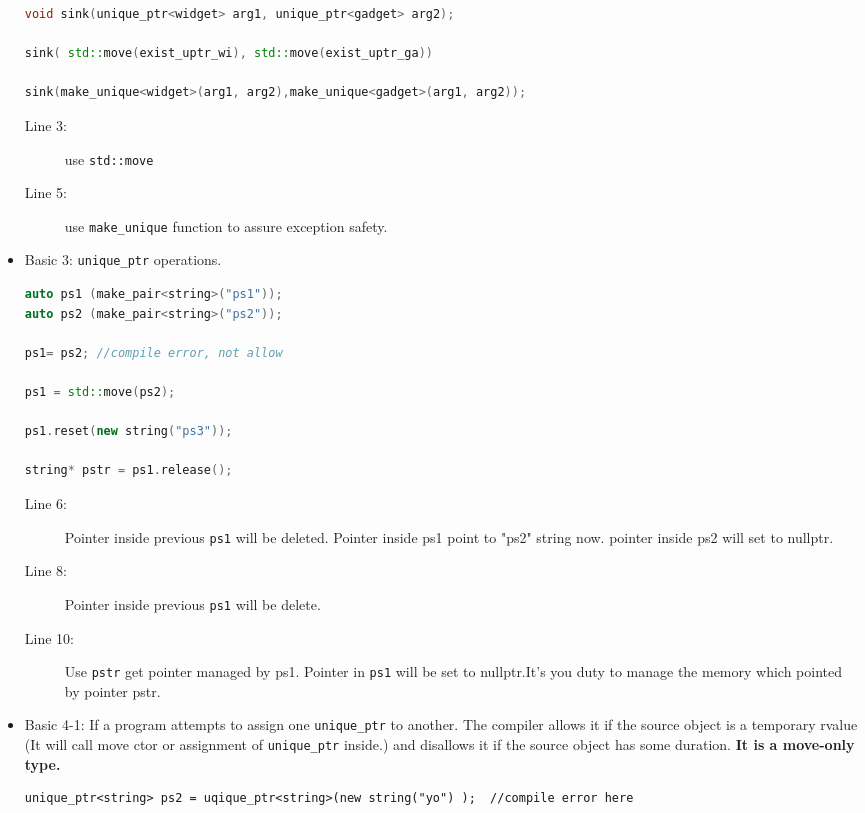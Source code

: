 \documentclass[a4paper,11pt,twoside]{book}
\begin{document}
\begin{itemize}
\begin{lstlisting}[frame=single, language=c++]
void sink(unique_ptr<widget> arg1, unique_ptr<gadget> arg2);

sink( std::move(exist_uptr_wi), std::move(exist_uptr_ga))

sink(make_unique<widget>(arg1, arg2),make_unique<gadget>(arg1, arg2));  
\end{lstlisting}
\begin{description} 
	\item[Line 3:] use \texttt{std::move}
	\item[Line 5:] use \texttt{make\_unique} function to assure exception safety.
\end{description}


\item Basic 3: \texttt{unique\_ptr} operations.
\begin{lstlisting}[frame=single, language=c++]
auto ps1 (make_pair<string>("ps1"));
auto ps2 (make_pair<string>("ps2"));

ps1= ps2; //compile error, not allow

ps1 = std::move(ps2);

ps1.reset(new string("ps3"));

string* pstr = ps1.release();
\end{lstlisting}
\begin{description}
	\item[Line 6:]  Pointer inside previous \texttt{ps1} will be deleted. Pointer inside ps1 point to "ps2" string now. pointer inside ps2 will set to nullptr.
	\item[Line 8:]  Pointer inside previous \texttt{ps1} will be delete.
	
	\item[Line 10:] Use \texttt{pstr} get pointer managed by ps1. Pointer in \texttt{ps1} will be set to nullptr.It's you duty to manage the memory which pointed by pointer pstr.
\end{description} 

\item Basic 4-1: If a program attempts to assign one \texttt{unique\_ptr} to another. The compiler allows it if the source object is a temporary rvalue (It will call move ctor or assignment of \texttt{unique\_ptr} inside.) and disallows it if the source object has some duration. \textbf{It is a move-only type.}
\begin{lstlisting}[numbers=none]
unique_ptr<string> ps2 = uqique_ptr<string>(new string("yo") );  //compile error here


\end{lstlisting}
\end{itemize}
\end{document}
